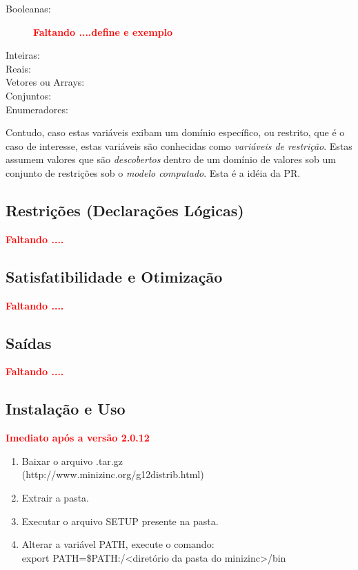 \begin{description}

  \item[Booleanas:] 
{\bf \textcolor{red}{Faltando ....define e exemplo}}
  
    \item[Inteiras:]
      \item[Reais:]
        \item[Vetores ou Arrays:]
                \item[Conjuntos:]
                
                \item[Enumeradores:]
\end{description}

Contudo, caso estas variáveis exibam um domínio
específico, ou restrito, que é o caso de interesse,
estas variáveis são conhecidas como
\textit{variáveis de restrição}.
Estas assumem valores que   são {\em descobertos} dentro de um domínio 
de valores sob um conjunto de restrições sob  o  \textit{modelo  computado}. Esta é a idéia da PR.


\subsection{Restrições (Declarações Lógicas)}

{\bf \textcolor{red}{Faltando ....}}
\subsection{Satisfatibilidade e Otimização}

{\bf \textcolor{red}{Faltando ....}}
\subsection{Saídas}

{\bf \textcolor{red}{Faltando ....}}


\subsection{Instalação e Uso}

{\bf \textcolor{red}{Imediato após a versão 2.0.12}}


\begin{enumerate}   

\item Baixar o arquivo .tar.gz \\\hspace*{0.3cm}(http://www.minizinc.org/g12distrib.html)
\item Extrair a pasta.
\item Executar o arquivo SETUP presente na pasta.
\item Alterar a variável PATH, execute o comando:
\\export PATH=\$PATH:/\textless diretório da pasta do 
minizinc\textgreater/bin
\end{enumerate}



